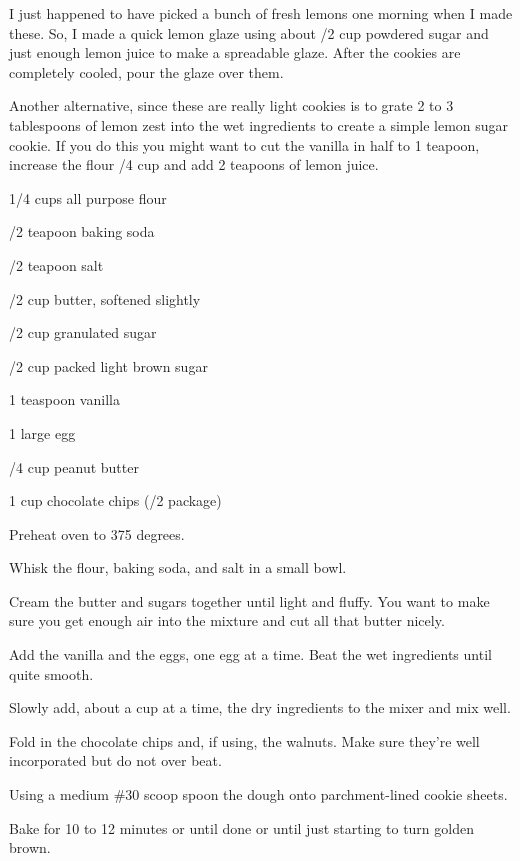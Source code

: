 \begin{ChefNotes}
    {I just happened to have picked a bunch of fresh lemons one morning when I
        made these. So, I made a quick lemon glaze using about /2 cup powdered sugar and
        just enough lemon juice to make a spreadable glaze. After the cookies are completely cooled,
        pour the glaze over them.

        Another alternative, since these are really light cookies is to grate 2 to 3 tablespoons of
        lemon zest into the wet ingredients to create a simple lemon sugar cookie. If you do this you
        might want to cut the vanilla in half to 1 teapoon, increase the flour /4 cup and
        add 2 teapoons of lemon juice.}
\end{ChefNotes}
%
%
%
%
\newpage



\begin{IngredientsAndSteps}
    \ListIngredientsAndSteps
    {
        1/4 cups all purpose flour

        /2 teapoon baking soda

        /2 teapoon salt

        \IngredientsSeparatorClear

        /2 cup butter, softened slightly

        /2 cup granulated sugar

        /2 cup packed light brown sugar

        \IngredientsSeparatorClear

        1 teaspoon vanilla

        1 large egg

        /4 cup peanut butter

        1 cup chocolate chips (/2 package)
    }
    {
        Preheat oven to 375 degrees.

        Whisk the flour, baking soda, and salt in a small bowl.

        Cream the butter and sugars together until light and fluffy. You want to make sure you get
        enough air into the mixture and cut all that butter nicely.

        Add the vanilla and the eggs, one egg at a time. Beat the wet ingredients until quite smooth.

        Slowly add, about a cup at a time, the dry ingredients to the mixer and mix well.

        Fold in the chocolate chips and, if using, the walnuts. Make sure they're well
        incorporated but do not over beat.

        Using a medium \#30 scoop spoon the dough onto parchment-lined cookie sheets.

        Bake for 10 to 12 minutes or until done or until just starting to turn golden brown.
    }
\end{IngredientsAndSteps}

